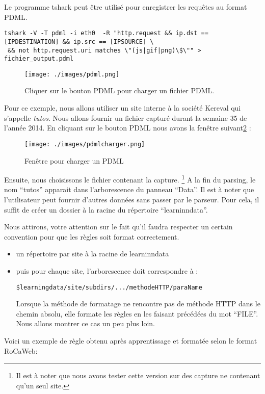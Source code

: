 \documentclass[a4paper,10pt,justified]{book}
\begin{document}
Le programme tshark peut être utilisé pour enregistrer les requêtes au format PDML.

\begin{lstlisting}[basicstyle=\tiny]
tshark -V -T pdml -i eth0  -R "http.request && ip.dst == [IPDESTINATION] && ip.src == [IPSOURCE] \
 && not http.request.uri matches \"(js|gif|png)\$\"" > fichier_output.pdml 
\end{lstlisting}




\begin{figure}
 \texttt{[image: ./images/pdml.png]}
\label{pdml}
\caption{Cliquer sur le bouton PDML pour charger un fichier PDML.}
 \end{figure}

Pour ce exemple, nous allons utiliser un site interne à la société Kereval qui s'appelle \textit{tutos}.  Nous allons fournir un fichier capturé durant la semaine 35 de l'année 2014. 
En cliquant sur le bouton PDML nous avons  la fenêtre suivant\ref{chargerPDML}  : 
\begin{figure}
 \texttt{[image: ./images/pdmlcharger.png]}
 \label{chargerPDML}
 \caption{Fenêtre pour charger un PDML}
\end{figure}

Ensuite, nous  choisissons le fichier contenant la capture. \footnote{Il est à noter que nous avons tester cette version sur des capture ne contenant qu'un seul site.}
A la fin du parsing, le nom ``tutos'' apparait dans l'arborescence du panneau ``Data''. 
Il est à noter que l'utilisateur peut fournir d'autres données sans passer par le parseur. Pour cela, il suffit de créer un dossier à la racine du répertoire ``learninndata''. 

Nous attirons, votre attention sur le fait qu'il faudra respecter un certain convention pour que les règles soit format correctement. 
\begin{itemize}
 \item un répertoire par site à la racine de learninndata
 \item puis pour chaque site, l'arborescence doit correspondre à : 
     
     
\begin{lstlisting}[basicstyle=\tiny]
$learningdata/site/subdirs/.../methodeHTTP/paraName 
\end{lstlisting}
     
Lorsque la méthode de formatage ne rencontre pas de méthode HTTP dans le chemin absolu, elle formate les règles en les faisant précédées du mot ``FILE''. 
Nous allons montrer ce cas un peu plus loin. 

\end{itemize}
Voici un exemple de règle obtenu après apprentissage et formatée selon le format RoCaWeb: 
\end{document}
